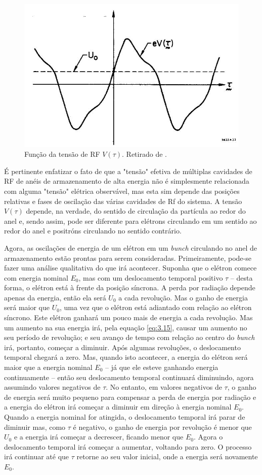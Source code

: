 \begin{figure}[!htb]
	\centering
	\includegraphics[width=0.6\linewidth]{./Figuras/fig33.jpeg}
	\caption{Função da tensão de RF $V(\tau)$. Retirado de \cite{sands1970physics}.}
	\label{fig:fig33}
\end{figure}

É pertinente enfatizar o fato de que a "tensão" efetiva de múltiplas cavidades de RF de anéis de armazenamento de alta energia não é simplesmente relacionada com alguma "tensão" elétrica observável, mas esta sim depende das posições relativas e fases de oscilação das várias cavidades de Rf do sistema. A tensão $V(\tau)$ depende, na verdade, do sentido de circulação da partícula ao redor do anel e, sendo assim, pode ser diferente para elétrons circulando em um sentido ao redor do anel e positróns circulando no sentido contrário.

Agora, as oscilações de energia de um elétron em um \textit{bunch} circulando no anel de armazenamento estão prontas para serem consideradas. Primeiramente, pode-se fazer uma análise qualitativa do que irá acontecer. Suponha que o elétron comece com energia nominal $E_0$, mas com um deslocamento temporal positivo $\tau$ -- desta forma, o elétron está à frente da posição síncrona. A perda por radiação depende apenas da energia, então ela será $U_0$ a cada revolução. Mas o ganho de energia será maior que $U_0$, uma vez que o elétron está adiantado com relação ao elétron síncrono. Este elétron ganhará um pouco mais de energia a cada revolução. Mas um aumento na sua energia irá, pela equação \eqref{eq:3.15}, causar um aumento no seu período de revolução; e seu avanço de tempo com relação ao centro do \textit{bunch} irá, portanto, começar a diminuir. Após algumas revoluções, o deslocamento temporal chegará a zero. Mas, quando isto acontecer, a energia do elétron será maior que a energia nominal $E_0$ -- já que ele esteve ganhando energia continuamente -- então seu deslocamento temporal continuará diminuindo, agora assumindo valores negativos de $\tau$. No entanto, em valores negativos de $\tau$, o ganho de energia será muito pequeno para compensar a perda de energia por radiação e a energia do elétron irá começar a diminuir em direção à energia nominal $E_0$. Quando a energia nominal for atingida, o deslocamento temporal irá parar de diminuir mas, como $\tau$ é negativo, o ganho de energia por revolução é menor que $U_0$ e a energia irá começar a decrescer, ficando menor que $E_0$. Agora o deslocamento temporal irá começar a aumentar, voltando para zero. O processo irá continuar até que $\tau$ retorne ao seu valor inicial, onde a energia será novamente $E_0$.

